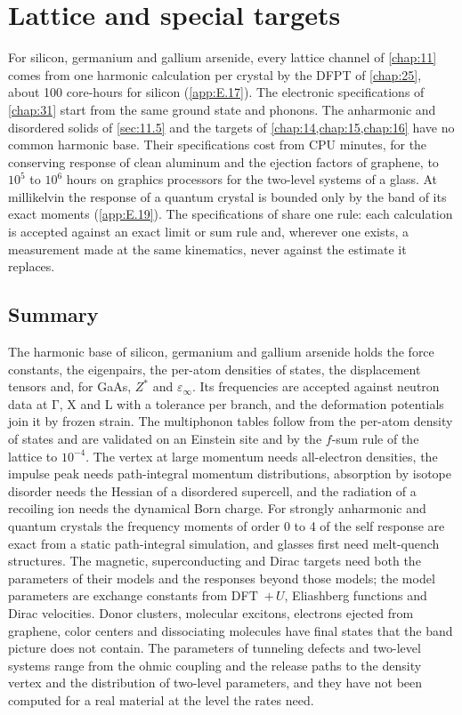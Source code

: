 \chapter{Lattice and special targets}\label{chap:30}

For silicon, germanium and gallium arsenide, every lattice channel of \cref{chap:11} comes from one harmonic calculation per crystal by the DFPT of \cref{chap:25}, about 100 core-hours for silicon (\cref{app:E.17}). The electronic specifications of \cref{chap:31} start from the same ground state and phonons. The anharmonic and disordered solids of \cref{sec:11.5} and the targets of \cref{chap:14,chap:15,chap:16} have no common harmonic base. Their specifications cost from CPU minutes, for the conserving response of clean aluminum and the ejection factors of graphene, to $10^5$ to $10^6$ hours on graphics processors for the two-level systems of a glass. At millikelvin the response of a quantum crystal is bounded only by the band of its exact moments (\cref{app:E.19}). The specifications of  share one rule: each calculation is accepted against an exact limit or sum rule and, wherever one exists, a measurement made at the same kinematics, never against the estimate it replaces.







\section*{Summary}

The harmonic base of silicon, germanium and gallium arsenide holds the force constants, the eigenpairs, the per-atom densities of states, the displacement tensors and, for GaAs, $Z^*$ and $\varepsilon_\infty$. Its frequencies are accepted against neutron data at $\mathrm{\Gamma}$, X and L with a tolerance per branch, and the deformation potentials join it by frozen strain. The multiphonon tables follow from the per-atom density of states and are validated on an Einstein site and by the $f$-sum rule of the lattice to $10^{-4}$. The vertex at large momentum needs all-electron densities, the impulse peak needs path-integral momentum distributions, absorption by isotope disorder needs the Hessian of a disordered supercell, and the radiation of a recoiling ion needs the dynamical Born charge. For strongly anharmonic and quantum crystals the frequency moments of order 0 to 4 of the self response are exact from a static path-integral simulation, and glasses first need melt-quench structures. The magnetic, superconducting and Dirac targets need both the parameters of their models and the responses beyond those models; the model parameters are exchange constants from DFT~$+\,U$, Eliashberg functions and Dirac velocities. Donor clusters, molecular excitons, electrons ejected from graphene, color centers and dissociating molecules have final states that the band picture does not contain. The parameters of tunneling defects and two-level systems range from the ohmic coupling and the release paths to the density vertex and the distribution of two-level parameters, and they have not been computed for a real material at the level the rates need.

\printbibliography[heading=subbibliography]
